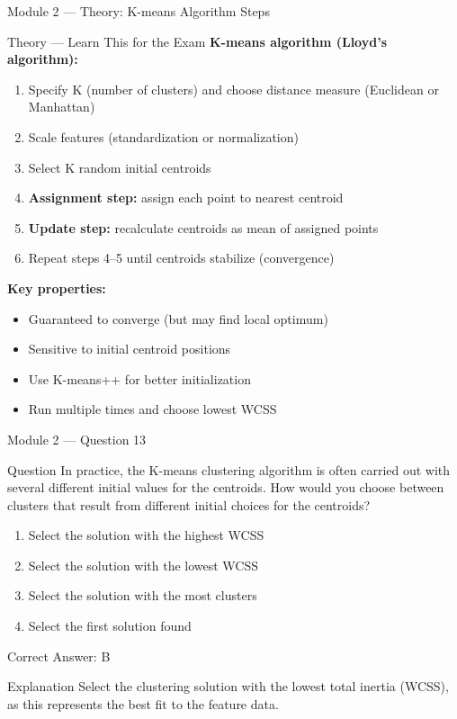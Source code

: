 \documentclass[aspectratio=169,10pt]{beamer}
\newcommand{\question}[1]{%
	\begin{block}{Question}
		#1
	\end{block}
}
\newcommand{\options}[4]{%
	\begin{enumerate}[label=\Alph*.,leftmargin=*]
		\item #1
		\item #2
		\item #3
		\item #4
	\end{enumerate}
}
\newcommand{\answerbox}[1]{%
	\begin{exampleblock}{Correct Answer: #1}
	\end{exampleblock}
}
\newcommand{\explain}[1]{%
	\begin{block}{Explanation}
		\small #1
	\end{block}
}
\newcommand{\theory}[1]{%
	\begin{block}{Theory --- Learn This for the Exam}
		\small #1
	\end{block}
}
\begin{document}
	\begin{frame}{Module 2 --- Theory: K-means Algorithm Steps}
		\theory{
			\textbf{K-means algorithm (Lloyd's algorithm):}
			\begin{enumerate}
				\item Specify K (number of clusters) and choose distance measure (Euclidean or Manhattan)
				\item Scale features (standardization or normalization)
				\item Select K random initial centroids
				\item \textbf{Assignment step:} assign each point to nearest centroid
				\item \textbf{Update step:} recalculate centroids as mean of assigned points
				\item Repeat steps 4--5 until centroids stabilize (convergence)
			\end{enumerate}
			\textbf{Key properties:}
			\begin{itemize}
				\item Guaranteed to converge (but may find local optimum)
				\item Sensitive to initial centroid positions
				\item Use K-means++ for better initialization
				\item Run multiple times and choose lowest WCSS
			\end{itemize}
		}
	\end{frame}
	
	\begin{frame}{Module 2 --- Question 13}
		\question{In practice, the K-means clustering algorithm is often carried out with several different initial values for the centroids. How would you choose between clusters that result from different initial choices for the centroids?}
		\options{Select the solution with the highest WCSS}{Select the solution with the lowest WCSS}{Select the solution with the most clusters}{Select the first solution found}
		\answerbox{B}
		\explain{Select the clustering solution with the lowest total inertia (WCSS), as this represents the best fit to the feature data.}
	\end{frame}
	
\end{document}
